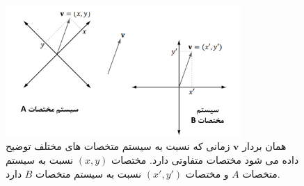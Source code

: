 {\begin{spacing}{1.5}
        \begin{figure}[H]
            \centering
            \setlength{\belowcaptionskip}{-10pt}
            \includegraphics[width=0.8\textwidth]{Images/4/3/4.Session.1.3.10}
            \caption {همان بردار $\textbf{v}$ زمانی که نسبت به سیستم متخصات های مختلف توضیح داده می شود مختصات متفاوتی دارد. مختصات $(x, y)$ نسبت به سیستم متخصات $A$ و مختصات $(x\prime, y\prime)$ نسبت به سیستم متخصات $B$ دارد.}
            \label{fig:4.Session.1.3.10}
        \end{figure}
    \end{spacing}
}

